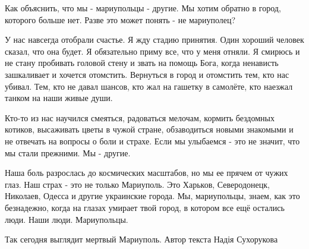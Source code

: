 
Как объяснить, что мы - мариупольцы - другие. Мы хотим обратно в город,
которого больше нет. Разве это может понять - не мариуполец? 

У нас навсегда отобрали счастье. Я жду стадию принятия. Один хороший человек
сказал, что она будет. Я обязательно приму все, что у меня отняли. Я смирюсь и
не стану пробивать головой стену и звать на помощь Бога, когда ненависть
зашкаливает и хочется отомстить. Вернуться в город  и отомстить тем, кто нас
убивал. Тем, кто не давал шансов, кто жал на гашетку в самолёте, кто наезжал
танком на наши  живые души. 


Кто-то из нас  научился смеяться, радоваться мелочам, кормить бездомных
котиков, высаживать цветы в чужой стране, обзаводиться новыми  знакомыми и не
отвечать на вопросы о боли и страхе. Если мы улыбаемся - это не значит, что мы
стали прежними. Мы - другие.


Наша боль разрослась до космических масштабов, но мы ее прячем от чужих глаз.
Наш страх - это не только Мариуполь. Это Харьков, Северодонецк, Николаев,
Одесса и другие украинские города. Мы, мариупольцы, знаем, как это безнадежно,
когда на  глазах умирает твой город, в котором все ещё остались люди. Наши
люди. Мариупольцы.








Так сегодня выглядит мертвый Мариуполь. Автор текста Надія Сухорукова

